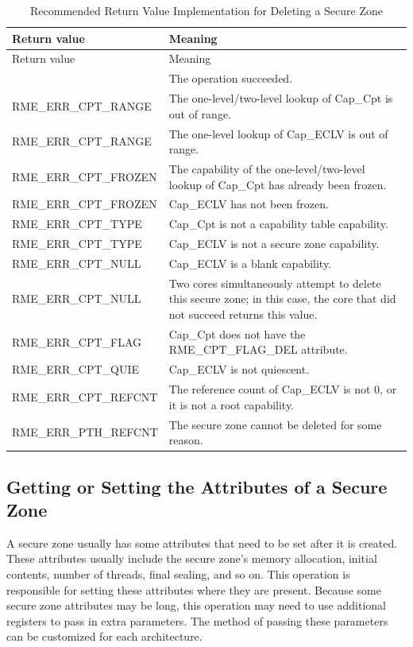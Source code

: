 \begin{xltabular}{\textwidth}{@{}>{\hsize\raggedright\arraybackslash}X>{\hsize\raggedright\arraybackslash}X@{}}
\caption{Recommended Return Value Implementation for Deleting a Secure Zone}\label{tab:8-97-delete-enclave-suggested-return-values}\\
\toprule
Return value & Meaning\tabularnewline
\endfirsthead
\toprule
Return value & Meaning\tabularnewline
\midrule
\endhead
\bottomrule
{} & The operation succeeded.\tabularnewline
    RME\_ERR\_CPT\_RANGE & The one-level/two-level lookup of Cap\_Cpt is out of range.\tabularnewline
    RME\_ERR\_CPT\_RANGE & The one-level lookup of Cap\_ECLV is out of range.\tabularnewline
    RME\_ERR\_CPT\_FROZEN & The capability of the one-level/two-level lookup of Cap\_Cpt has already been frozen.\tabularnewline
    RME\_ERR\_CPT\_FROZEN & Cap\_ECLV has not been frozen.\tabularnewline
    RME\_ERR\_CPT\_TYPE & Cap\_Cpt is not a capability table capability.\tabularnewline
    RME\_ERR\_CPT\_TYPE & Cap\_ECLV is not a secure zone capability.\tabularnewline
    RME\_ERR\_CPT\_NULL & Cap\_ECLV is a blank capability.\tabularnewline
    RME\_ERR\_CPT\_NULL & Two cores simultaneously attempt to delete this secure zone; in this case, the core that did not succeed returns this value.\tabularnewline
    RME\_ERR\_CPT\_FLAG & Cap\_Cpt does not have the RME\_CPT\_FLAG\_DEL attribute.\tabularnewline
    RME\_ERR\_CPT\_QUIE & Cap\_ECLV is not quiescent.\tabularnewline
    RME\_ERR\_CPT\_REFCNT & The reference count of Cap\_ECLV is not 0, or it is not a root capability.\tabularnewline
    RME\_ERR\_PTH\_REFCNT & The secure zone cannot be deleted for some reason.\tabularnewline
\end{xltabular}
\nopagebreak[4]

\subsection{Getting or Setting the Attributes of a Secure Zone}\label{subsec:8-get-or-set-enclave-attributes}

A secure zone usually has some attributes that need to be set after it is created. These attributes usually include the secure zone's memory allocation, initial contents, number of threads, final sealing, and so on. This operation is responsible for setting these attributes where they are present. Because some secure zone attributes may be long, this operation may need to use additional registers to pass in extra parameters. The method of passing these parameters can be customized for each architecture.

